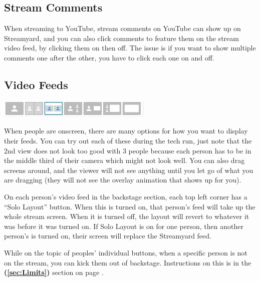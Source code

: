 \documentclass{article}
\begin{document}
\subsection{Stream Comments}
When streaming to YouTube, stream comments on YouTube can show up on Streamyard, and you can also click comments to feature them on the stream video feed, by clicking them on then off. The issue is if you want to show multiple comments one after the other, you have to click each one on and off. 

\subsection{Video Feeds}

\includegraphics{VCP_Streamyard_Camera_views} %

When people are onscreen, there are many options for how you want to display their feeds. You can try out each of these during the tech run, just note that the 2nd view does not look too good with 3 people because each person has to be in the middle third of their camera which might not look well. You can also drag screens around, and the viewer will not see anything until you let go of what you are dragging (they will not see the overlay animation that shows up for you). 

On each person’s video feed in the backstage section, each top left corner has a “Solo Layout” button. When this is turned on, that person’s feed will take up the whole stream screen. When it is turned off, the layout will revert to whatever it was before it was turned on. If Solo Layout is on for one person, then another person’s is turned on, their screen will replace the Streamyard feed.

While on the topic of peoples’ individual buttons, when a specific person is not on the stream, you can kick them out of backstage. Instructions on this is in the \textbf{ (\ref{sec:Limits})} section on page \pageref{sec:Limits}.
\end{document}
